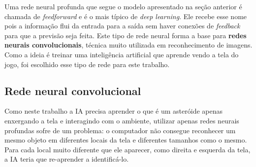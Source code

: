 Uma rede neural profunda que segue o modelo apresentado na seção anterior é chamada de \textit{feedforward} e é o mais típico de \textit{deep learning}. Ele recebe esse nome pois a informação flui da entrada para a saída sem haver conexões de \textit{feedback} para que a previsão seja feita. Este tipo de rede neural forma a base para \textbf{redes neurais convolucionais}, técnica muito utilizada em reconhecimento de imagens. Como a ideia é treinar uma inteligência artificial que aprende vendo a tela do jogo, foi escolhido esse tipo de rede para este trabalho.


\subsection{Rede neural convolucional}
\label{sec:cnn}

Como neste trabalho a IA precisa aprender o que é um asteróide apenas enxergando a tela e interagindo com o ambiente, utilizar apenas redes neurais profundas sofre de um problema: o computador não consegue reconhecer um mesmo objeto em diferentes locais da tela e diferentes tamanhos como o mesmo. Para cada local muito diferente que ele aparecer, como direita e esquerda da tela, a IA teria que re-aprender a identificá-lo.


